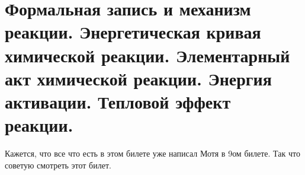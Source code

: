 
	\section{Формальная запись и механизм реакции. Энергетическая кривая химической реакции. Элементарный акт химической реакции. Энергия активации. Тепловой эффект реакции. }
	Кажется, что все что есть в этом билете уже написал Мотя в 9ом билете. Так что советую смотреть этот билет.

